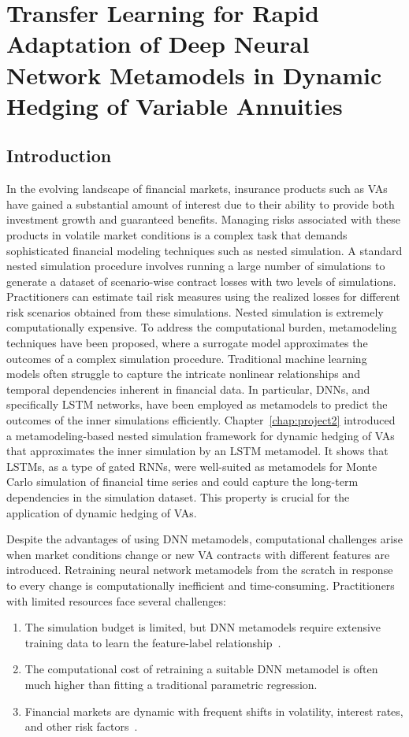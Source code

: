 \chapter{Transfer Learning for Rapid Adaptation of Deep Neural Network Metamodels in Dynamic Hedging of Variable Annuities} \label{chap:project3}

\section{Introduction}

In the evolving landscape of financial markets, insurance products such as VAs have gained a substantial amount of interest due to their ability to provide both investment growth and guaranteed benefits. 
Managing risks associated with these products in volatile market conditions is a complex task that demands sophisticated financial modeling techniques such as nested simulation.
A standard nested simulation procedure involves running a large number of simulations to generate a dataset of scenario-wise contract losses with two levels of simulations.
Practitioners can estimate tail risk measures using the realized losses for different risk scenarios obtained from these simulations.
Nested simulation is extremely computationally expensive.
To address the computational burden, metamodeling techniques have been proposed, where a surrogate model approximates the outcomes of a complex simulation procedure. 
Traditional machine learning models often struggle to capture the intricate nonlinear relationships and temporal dependencies inherent in financial data.
In particular, DNNs, and specifically LSTM networks, have been employed as metamodels to predict the outcomes of the inner simulations efficiently.
Chapter~\ref{chap:project2} introduced a metamodeling-based nested simulation framework for dynamic hedging of VAs that approximates the inner simulation by an LSTM metamodel.
It shows that LSTMs, as a type of gated RNNs, were well-suited as metamodels for Monte Carlo simulation of financial time series and could capture the long-term dependencies in the simulation dataset.
This property is crucial for the application of dynamic hedging of VAs.

Despite the advantages of using DNN metamodels, computational challenges arise when market conditions change or new VA contracts with different features are introduced. 
Retraining neural network metamodels from the scratch in response to every change is computationally inefficient and time-consuming.
Practitioners with limited resources face several challenges:
\begin{enumerate}
    \item The simulation budget is limited, but DNN metamodels require extensive training data to learn the feature-label relationship~\citep{golestaneh2024many}. 
    \item The computational cost of retraining a suitable DNN metamodel is often much higher than fitting a traditional parametric regression.
    \item Financial markets are dynamic with frequent shifts in volatility, interest rates, and other risk factors~\citep{cont2001empirical}.
\end{enumerate}

